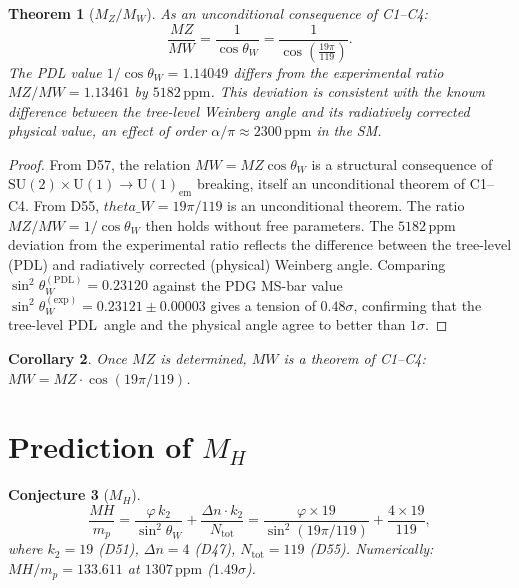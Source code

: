 \documentclass[12pt,a4paper]{article}
\newtheorem{theorem}{Theorem}[section]
\newtheorem{corollary}[theorem]{Corollary}
\newtheorem{conjecture}[theorem]{Conjecture}
\theoremstyle{remark}
\newcommand{\PDL}{\textsc{pdl}}
\newcommand{\Ntot}{N_{\mathrm{tot}}}
\newcommand{\thetaW}{\theta_{W}}
\newcommand{\sinthW}{\sin^{2}\!\theta_{W}}
\newcommand{\cosW}{\cos\theta_{W}}
\newcommand{\MZ}{M_{Z}}
\newcommand{\MW}{M_{W}}
\newcommand{\MH}{M_{H}}
\newcommand{\ppm}{\,\mathrm{ppm}}
\newcommand{\mproton}{m_{p}}
\def\PDL{PDL}%
\def\MZ{MZ}%
\def\MW{MW}%
\def\MH{MH}%
\def\thetaW{theta\_W}%
\begin{document}
\begin{theorem}[\texorpdfstring{$M_Z/M_W$}{MZ/MW}]\label{thm:mzmw}
As an unconditional consequence of C1--C4:
\begin{equation}\label{eq:mzmw}
\frac{\MZ}{\MW} = \frac{1}{\cosW} = \frac{1}{\cos\!\left(\tfrac{19\pi}{119}\right)}.
\end{equation}
The PDL value $1/\cosW=1.14049$ differs from the experimental ratio
$\MZ/\MW=1.13461$ by $5182\ppm$. This deviation is consistent with the known
difference between the tree-level Weinberg angle and its radiatively corrected
physical value, an effect of order $\alpha/\pi\approx2300\ppm$ in the SM.
\end{theorem}

\begin{proof}
From D57, the relation $\MW=\MZ\cosW$ is a structural consequence of
$\mathrm{SU}(2)\times\mathrm{U}(1)\to\mathrm{U}(1)_{\mathrm{em}}$ breaking,
itself an unconditional theorem of C1--C4. From D55, $\thetaW=19\pi/119$ is
an unconditional theorem. The ratio $\MZ/\MW=1/\cosW$ then holds without free
parameters. The $5182\ppm$ deviation from the experimental ratio reflects the
difference between the tree-level (PDL) and radiatively corrected (physical)
Weinberg angle. Comparing $\sinthW^{(\mathrm{PDL})}=0.23120$ against the PDG
MS-bar value $\sinthW^{(\mathrm{exp})}=0.23121\pm0.00003$ gives a tension
of $0.48\sigma$, confirming that the tree-level \PDL\ angle and the physical
angle agree to better than $1\sigma$.
\end{proof}

\begin{corollary}\label{cor:mw}
Once $\MZ$ is determined, $\MW$ is a theorem of C1--C4:
$\MW = \MZ\cdot\cos(19\pi/119)$.
\end{corollary}

\section{Prediction of \texorpdfstring{$M_H$}{MH}}

\begin{conjecture}[\texorpdfstring{$M_H$}{MH}]\label{conj:mh}
\begin{equation}\label{eq:mh}
\frac{\MH}{\mproton} = \frac{\varphi\,k_{2}}{\sinthW}
+ \frac{\Delta n\cdot k_{2}}{\Ntot}
= \frac{\varphi\times19}{\sin^{2}(19\pi/119)} + \frac{4\times19}{119},
\end{equation}
where $k_{2}=19$ \emph{(D51)}, $\Delta n=4$ \emph{(D47)}, $\Ntot=119$
\emph{(D55)}. Numerically: $\MH/\mproton=133.611$ at $1307\ppm$ ($1.49\sigma$).
\end{conjecture}
\end{document}
